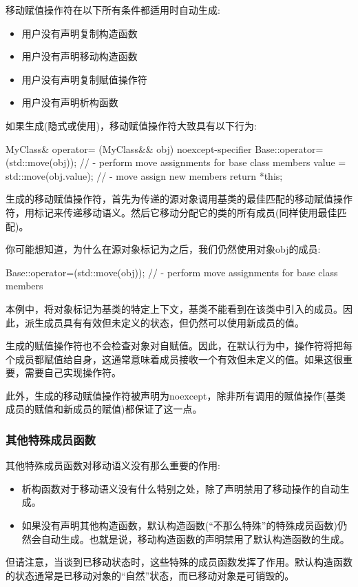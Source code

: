 移动赋值操作符在以下所有条件都适用时自动生成:

\begin{itemize}
	\item 用户没有声明复制构造函数
	\item 用户没有声明移动构造函数
	\item 用户没有声明复制赋值操作符
	\item 用户没有声明析构函数
\end{itemize}

如果生成(隐式或使用)，移动赋值操作符大致具有以下行为:

\begin{cppcode}
MyClass& operator= (MyClass&& obj) noexcept-specifier {
	Base::operator=(std::move(obj)); // - perform move assignments for base class members
	value = std::move(obj.value); // - move assign new members
	return *this;
}
\end{cppcode}

生成的移动赋值操作符，首先为传递的源对象调用基类的最佳匹配的移动赋值操作符，用标记来传递移动语义。然后它移动分配它的类的所有成员(同样使用最佳匹配)。

你可能想知道，为什么在源对象标记为之后，我们仍然使用对象obj的成员:

\begin{cppcode}
Base::operator=(std::move(obj)); // - perform move assignments for base class members
\end{cppcode}

本例中，将对象标记为基类的特定上下文，基类不能看到在该类中引入的成员。因此，派生成员具有有效但未定义的状态，但仍然可以使用新成员的值。

生成的赋值操作符也不会检查对象对自赋值。因此，在默认行为中，操作符将把每个成员都赋值给自身，这通常意味着成员接收一个有效但未定义的值。如果这很重要，需要自己实现操作符。

此外，生成的移动赋值操作符被声明为noexcept，除非所有调用的赋值操作(基类成员的赋值和新成员的赋值)都保证了这一点。

\subsubsection{其他特殊成员函数}

其他特殊成员函数对移动语义没有那么重要的作用:

\begin{itemize}
	\item 析构函数对于移动语义没有什么特别之处，除了声明禁用了移动操作的自动生成。
	\item 如果没有声明其他构造函数，默认构造函数(“不那么特殊”的特殊成员函数)仍然会自动生成。也就是说，移动构造函数的声明禁用了默认构造函数的生成。
\end{itemize}

但请注意，当谈到已移动状态时，这些特殊的成员函数发挥了作用。默认构造函数的状态通常是已移动对象的“自然”状态，而已移动对象是可销毁的。
















